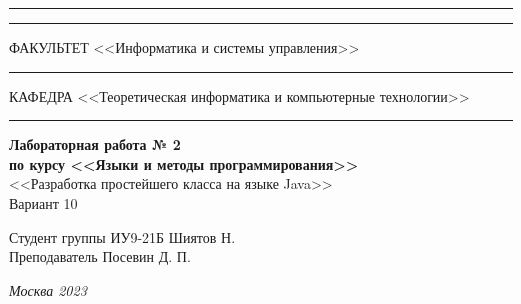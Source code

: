 \documentclass[a4paper, 14pt]{extarticle}
\begin{document}
\begin{titlepage}
\vspace{-25pt}
\hspace{-35pt}\rule{\textwidth}{2.3pt}

\vspace*{-20.3pt}
\hspace{-35pt}\rule{\textwidth}{0.4pt}

\vspace{1.5ex}
\hspace{-35pt} \noindent \small ФАКУЛЬТЕТ\hspace{80pt} <<Информатика и системы управления>>

\vspace*{-16pt}
\hspace{47pt}\rule{0.83\textwidth}{0.4pt}

\vspace{0.5ex}
\hspace{-35pt} \noindent \small КАФЕДРА\hspace{50pt} <<Теоретическая информатика и компьютерные технологии>>

\vspace*{-16pt}
\hspace{30pt}\rule{0.866\textwidth}{0.4pt}
  
\vspace{11em}

\begin{center}
\Large {\bf Лабораторная работа № 2} \\ 
\large {\bf по курсу <<Языки и методы программирования>>} \\
\large <<Разработка простейшего класса на языке Java>> \\
\Large Вариант 10
\end{center}\normalsize

\vspace{8em}


\begin{flushright}
  {Студент группы ИУ9-21Б Шиятов Н. \hspace*{15pt}\\ 
  \vspace{2ex}
  Преподаватель Посевин Д. П.\hspace*{15pt}}
\end{flushright}

\bigskip

\vfill
 

\begin{center}
\textsl{Москва 2023}
\end{center}
\end{titlepage}
\end{document}
